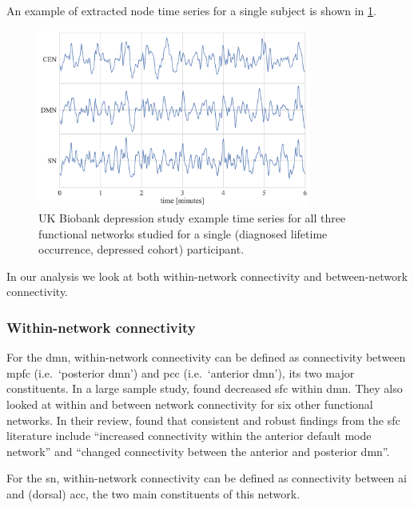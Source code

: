 

An example of extracted node time series for a single subject is shown in \cref{fig:ukb-fn-example-time-series}.


\begin{figure}[ht]
  \centering
  \includegraphics[width=0.8\textwidth]{fig/ukbiobank/node_timeseries/diagnosed_lifetime_occurrence/depressed/time_series_functional_networks_of_interest}
  \caption{
    UK Biobank depression study example time series for all three functional networks studied for a single (diagnosed lifetime occurrence, depressed cohort) participant.
  }\label{fig:ukb-fn-example-time-series}
\end{figure}


In our analysis we look at both within-network connectivity and between-network connectivity.

\subsubsection{Within-network connectivity}

For the \gls{dmn}, within-network connectivity can be defined as connectivity between \gls{mpfc} (i.e.~`posterior \gls{dmn}') and \gls{pcc} (i.e.~`anterior \gls{dmn}'), its two major constituents.
In a large sample study, \textcite{Yan2019} found decreased \gls{sfc} within \gls{dmn}.
They also looked at within and between network connectivity for six other functional networks.
In their review, \textcite{Mulders2015} found that consistent and robust findings from the \gls{sfc} literature include ``increased connectivity within the anterior default mode network'' and ``changed connectivity between the anterior and posterior \gls{dmn}''.

For the \gls{sn}, within-network connectivity can be defined as connectivity between \gls{ai} and (dorsal) \gls{acc}, the two main constituents of this network.

